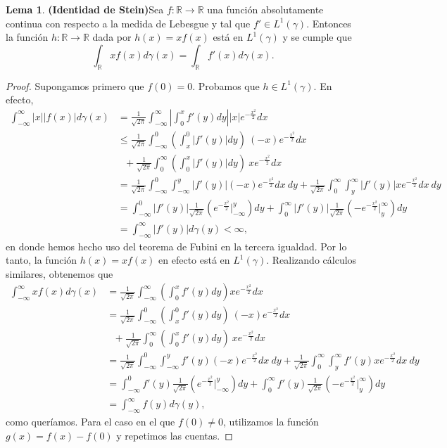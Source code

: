 \documentclass[letterpaper,twoside,12pt]{book}
\newcommand{\R}{\mathbb{R}}
\newcommand{\1}{\mathds{1}}
\newcommand{\abs}[1]{\left\lvert #1 \right\rvert}
\renewcommand{\to}{\rightarrow}
\theoremstyle{definition}
\theoremstyle{definition}
\theoremstyle{remark}
\theoremstyle{definition}
\theoremstyle{definition}
\theoremstyle{definition}
\theoremstyle{definition}
\theoremstyle{definition}
\newtheorem{lema}{Lema}
\begin{document}
\begin{lema}\textbf{(Identidad de Stein)}\label{lema1}
Sea $f:\R\to\R$ una función absolutamente continua con respecto a la medida de Lebesgue y tal que $f'\in L^{1}(\gamma)$. Entonces la función $h:\R\to\R$ dada por $h(x)=xf(x)$ está en $L^1(\gamma)$ y se cumple que 
\[
\int_\R xf(x)d\gamma(x)=\int_\R f'(x)d\gamma(x).
\]
\end{lema}
\begin{proof} 
  Supongamos primero que $f(0)=0$. Probamos que $h\in L^{1}(\gamma)$. En efecto,  
  \begin{align*}
   \int_{-\infty}^{\infty}|x||f(x)|d\gamma(x)&=\frac{1}{\sqrt{2\pi}}\int_{-\infty}^\infty\abs{\int_0^{x}f'(y)dy}|x|e^{-\frac{x^2}{2}}dx\\
   &\leq\frac{1}{\sqrt{2\pi}}\int_{-\infty}^0 \left(\int_x^{0}\abs{f'(y)}dy\right) \ (-x)e^{-\frac{x^2}{2}}dx\\
   & \ \ \  +\frac{1}{\sqrt{2\pi}}\int_{0}^\infty \left(\int_0^{x}\abs{f'(y)}dy\right) \ xe^{-\frac{x^2}{2}}dx\\
   &=\frac{1}{\sqrt{2\pi}}\int_{-\infty}^0 \int_{-\infty}^{y}\abs{f'(y)}(-x)e^{-\frac{x^2}{2}}dx \ dy+\frac{1}{\sqrt{2\pi}} \int_{0}^{\infty}\int_{y}^\infty \abs{f'(y)}xe^{-\frac{x^2}{2}}dx \ dy\\
   &=\int_{-\infty}^0 \abs{f'(y)}\frac{1}{\sqrt{2\pi}}\left(e^{-\frac{x^2}{2}}\Big|_{-\infty}^{y}\right) dy + \int_{0}^{\infty}\abs{f'(y)}\frac{1}{\sqrt{2\pi}}\left(-e^{-\frac{x^2}{2}}\Big|_{y}^{\infty}\right)dy\\
   &=\int_{-\infty}^{\infty}|f'(y)|d\gamma(y)<\infty,
  \end{align*}
  en donde hemos hecho uso del teorema de Fubini en la tercera igualdad. Por lo tanto, la función $h(x)=xf(x)$ en efecto está en $L^1(\gamma)$. Realizando cálculos similares, obtenemos que 
  \begin{align*}
   \int_{-\infty}^{\infty}xf(x)d\gamma(x)&=\frac{1}{\sqrt{2\pi}}\int_{-\infty}^\infty \left(\int_0^{x}f'(y)dy\right) xe^{-\frac{x^2}{2}}dx\\
   &=\frac{1}{\sqrt{2\pi}}\int_{-\infty}^0 \left(\int_x^{0}f'(y)dy\right) \ (-x)e^{-\frac{x^2}{2}}dx\\
   & \ \ \  +\frac{1}{\sqrt{2\pi}}\int_{0}^\infty \left(\int_0^{x}f'(y) dy\right) \ xe^{-\frac{x^2}{2}}dx\\
   &=\frac{1}{\sqrt{2\pi}}\int_{-\infty}^0 \int_{-\infty}^{y}f'(y)(-x)e^{-\frac{x^2}{2}}dx\ dy+\frac{1}{\sqrt{2\pi}} \int_{0}^{\infty}\int_{y}^\infty f'(y)xe^{-\frac{x^2}{2}}dx\ dy\\
   &=\int_{-\infty}^0 f'(y)\frac{1}{\sqrt{2\pi}}\left(e^{-\frac{x^2}{2}}\Big|_{-\infty}^{y}\right) dy + \int_{0}^{\infty}f'(y)\frac{1}{\sqrt{2\pi}}\left(-e^{-\frac{x^2}{2}}\Big|_{y}^{\infty}\right)dy\\
   &=\int_{-\infty}^{\infty}f(y)d\gamma(y),
  \end{align*}
  como queríamos. Para el caso en el que $f(0)\neq 0$, utilizamos la función $g(x)=f(x)-f(0)$ y repetimos las cuentas.
\end{proof}
\end{document}
